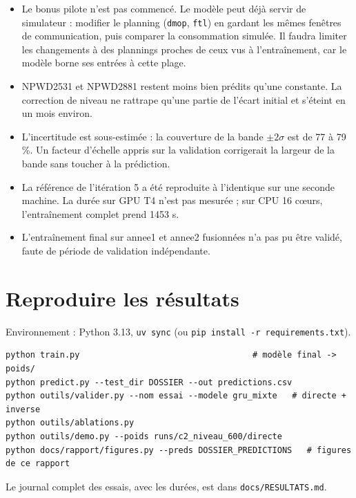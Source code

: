\documentclass[11pt,a4paper]{article}
\newcommand{\code}[1]{\texttt{#1}}
\begin{document}
\begin{itemize}
  \item Le bonus pilote n'est pas commencé. Le modèle peut déjà servir de simulateur : modifier le planning (\code{dmop}, \code{ftl}) en gardant les mêmes fenêtres de communication, puis comparer la consommation simulée. Il faudra limiter les changements à des plannings proches de ceux vus à l'entraînement, car le modèle borne ses entrées à cette plage.
  \item NPWD2531 et NPWD2881 restent moins bien prédits qu'une constante. La correction de niveau ne rattrape qu'une partie de l'écart initial et s'éteint en un mois environ.
  \item L'incertitude est sous-estimée : la couverture de la bande $\pm 2\sigma$ est de 77 à 79 \%. Un facteur d'échelle appris sur la validation corrigerait la largeur de la bande sans toucher à la prédiction.
  \item La référence de l'itération 5 a été reproduite à l'identique sur une seconde machine. La durée sur GPU T4 n'est pas mesurée ; sur CPU 16 cœurs, l'entraînement complet prend 1453 s.
  \item L'entraînement final sur annee1 et annee2 fusionnées n'a pas pu être validé, faute de période de validation indépendante.
\end{itemize}

\appendix
\section{Reproduire les résultats}

Environnement : Python 3.13, \code{uv sync} (ou \code{pip install -r requirements.txt}).

\begin{small}
\begin{verbatim}
python train.py                                   # modèle final -> poids/
python predict.py --test_dir DOSSIER --out predictions.csv
python outils/valider.py --nom essai --modele gru_mixte   # directe + inverse
python outils/ablations.py
python outils/demo.py --poids runs/c2_niveau_600/directe
python docs/rapport/figures.py --preds DOSSIER_PREDICTIONS   # figures de ce rapport
\end{verbatim}
\end{small}

Le journal complet des essais, avec les durées, est dans \code{docs/RESULTATS.md}.
\end{document}
